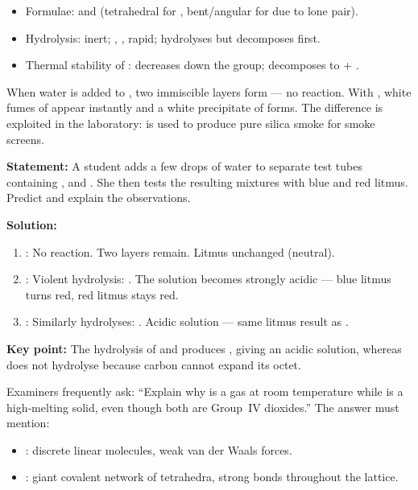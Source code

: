 \documentclass[11pt]{article}
\begin{document}
\begin{aretenir}
\begin{itemize}
\item Formulae:  and  (tetrahedral for , bent/angular for  due to lone pair).
\item Hydrolysis:  inert; , ,  rapid;  hydrolyses but decomposes first.
\item Thermal stability of : decreases down the group;  decomposes to  + .
\end{itemize}
\end{aretenir}

\begin{exemplebox}
When water is added to , two immiscible layers form — no reaction. With , white fumes of  appear instantly and a white precipitate of  forms. The difference is exploited in the laboratory:  is used to produce pure silica smoke for smoke screens.
\end{exemplebox}

\begin{exoresolu}
\textbf{Statement:} A student adds a few drops of water to separate test tubes containing ,  and . She then tests the resulting mixtures with blue and red litmus. Predict and explain the observations.

\textbf{Solution:}
\begin{enumerate}
\item {}: No reaction. Two layers remain. Litmus unchanged (neutral).
\item {}: Violent hydrolysis: . The solution becomes strongly acidic — blue litmus turns red, red litmus stays red.
\item {}: Similarly hydrolyses: . Acidic solution — same litmus result as .
\end{enumerate}
\textbf{Key point:} The hydrolysis of  and  produces , giving an acidic solution, whereas  does not hydrolyse because carbon cannot expand its octet.
\end{exoresolu}

\begin{aretenir}
Examiners frequently ask: ``Explain why  is a gas at room temperature while  is a high‑melting solid, even though both are Group~IV dioxides.'' The answer must mention:
\begin{itemize}
\item {}: discrete linear molecules, weak van der Waals forces.
\item {}: giant covalent network of \ce{[SiO4]} tetrahedra, strong  bonds throughout the lattice.
\end{itemize}
\end{aretenir}
\end{document}
